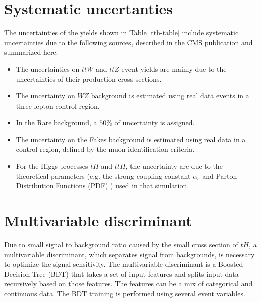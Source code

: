 \pagebreak

\section{Systematic uncertanties}
The uncertainties of the yields shown in Table \ref{tth-table} include systematic uncertainties due to the following sources, described in the CMS publication\cite{th1} and summarized here:
\begin{itemize}
\item The uncertainties on $t\bar{t}W$ and $t\bar{t}Z$ event yields are mainly due to the uncertainties of their production cross sections. 
\item The uncertainty on $WZ$ background is estimated using real data events in a three lepton control region. 
\item In the Rare background, a $50\%$ of uncertainty is assigned.
\item The uncertainty on the Fakes background is estimated using real data in a control region, defined by the muon identification criteria. 
\item For the Higgs processes $tH$ and $ttH$, the uncertainty are due to the theoretical parameters (e.g. the strong coupling constant $\alpha_s$ and Parton Distribution Functions (PDF) ) used in that simulation.
\end{itemize}



\pagebreak
\section{Multivariable discriminant}
Due to small signal to background ratio caused by the small cross section of $tH$, a multivariable discriminant, which separates signal from backgrounds, is necessary to optimize the signal sensitivity. The multivariable discriminant is a Boosted Decision Tree (BDT) that takes a set of input features and splits input data recursively based on those features\cite{tmva}. The features can be a mix of categorical and continuous data.
The BDT training is performed using several event variables.


